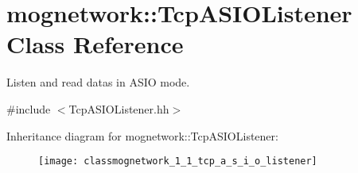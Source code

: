 \hypertarget{classmognetwork_1_1_tcp_a_s_i_o_listener}{\section{mognetwork\-:\-:Tcp\-A\-S\-I\-O\-Listener Class Reference}
\label{classmognetwork_1_1_tcp_a_s_i_o_listener}
}


Listen and read datas in A\-S\-I\-O mode.  




{\ttfamily \#include $<$Tcp\-A\-S\-I\-O\-Listener.\-hh$>$}

Inheritance diagram for mognetwork\-:\-:Tcp\-A\-S\-I\-O\-Listener\-:\begin{figure}[H]
\begin{center}
\leavevmode
\texttt{[image: classmognetwork\_1\_1\_tcp\_a\_s\_i\_o\_listener]}
\end{center}
\end{figure}
